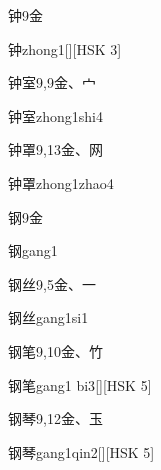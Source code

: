 \begin{entry}{钟}{9}{⾦}
  \begin{phonetics}{钟}{zhong1}[][HSK 3]
  \end{phonetics}
\end{entry}

\begin{entry}{钟室}{9,9}{⾦、⼧}
  \begin{phonetics}{钟室}{zhong1shi4}
  \end{phonetics}
\end{entry}

\begin{entry}{钟罩}{9,13}{⾦、⽹}
  \begin{phonetics}{钟罩}{zhong1zhao4}
  \end{phonetics}
\end{entry}

\begin{entry}{钢}{9}{⾦}
  \begin{phonetics}{钢}{gang1}
  \end{phonetics}
\end{entry}

\begin{entry}{钢丝}{9,5}{⾦、⼀}
  \begin{phonetics}{钢丝}{gang1si1}
  \end{phonetics}
\end{entry}

\begin{entry}{钢笔}{9,10}{⾦、⽵}
  \begin{phonetics}{钢笔}{gang1 bi3}[][HSK 5]
  \end{phonetics}
\end{entry}

\begin{entry}{钢琴}{9,12}{⾦、⽟}
  \begin{phonetics}{钢琴}{gang1qin2}[][HSK 5]
  \end{phonetics}
\end{entry}

